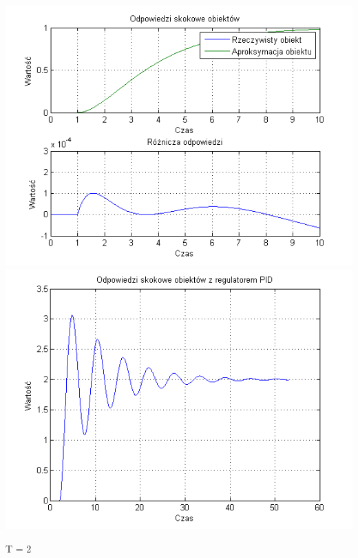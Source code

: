 \documentclass[10pt,a4paper]{article}
\begin{document}
\begin{center}
\includegraphics[scale=1]{images/dwa/skrypt_63.png}\\
\includegraphics[scale=1]{images/dwa/skrypt_64.png}\\
\end{center}
\newpage
T = 2
\end{document}
